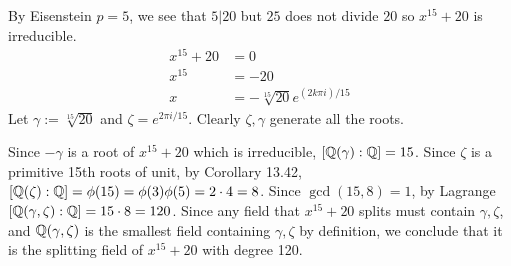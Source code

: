 \documentclass[12pt]{article}
\begin{document}
\begin{problem}[11]
By Eisenstein $ p=5$, we see that  $ 5|20$ but  $ 25 $ does not divide $ 20$ so  $ x^{15}+20$ is irreducible.
\begin{align*}
	x^{15}+20 &= 0 \\
	x^{15} &= -20 \\
	x &= -\sqrt[15]{20} e^{(2k\pi i) /15}
\end{align*}
Let $ \gamma:= \sqrt[15]{20} $ and $ \zeta = e^{2\pi i/15}$. Clearly $ \zeta, \gamma$ generate all the roots.

Since $ -\gamma$ is a root of $ x^{15}+20$ which is irreducible, $ [ \mathbb{Q}( \gamma): \mathbb{Q}] = 15$. Since $ \zeta$ is a primitive 15th roots of unit, by Corollary 13.42, $ [ \mathbb{Q}(\zeta): \mathbb{Q}] = \phi(15)=\phi(3)\phi(5)=2 \cdot 4= 8$. Since $ \gcd ( 15,8)=1 $, by Lagrange $ [\mathbb{Q}( \gamma, \zeta) : \mathbb{Q}] = 15 \cdot 8 = 120$. Since any field that $ x^{15}+20$ splits must contain $\gamma, \zeta$, and $ \mathbb{Q}( \gamma, \zeta)$ is the smallest field containing $ \gamma,\zeta$ by definition, we conclude that it is the splitting field of $ x^{15}+20$ with degree 120.
\end{problem}
\end{document}
